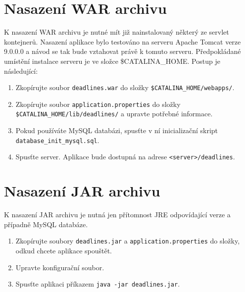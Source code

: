 \documentclass[thesis=B,czech]{FITthesis}[2012/06/26]
\begin{document}
	\section{Nasazení WAR archivu}
		K nasazení WAR archivu je nutné mít již nainstalovaný některý ze servlet kontejnerů. Nasazení aplikace bylo testováno na serveru Apache Tomcat verze 9.0.0.0 a návod se tak bude vztahovat právě k tomuto serveru. Předpokládané umístění instalace serveru je ve složce \$CATALINA\_HOME. Postup je následující:
		\begin{enumerate}
			\item Zkopírujte soubor \texttt{deadlines.war} do složky \texttt{\$CATALINA\_HOME/\allowbreak webapps/}.
			\item Zkopírujte soubor \texttt{application.properties} do složky \texttt{\$CATALINA\_HOME/\allowbreak lib/\allowbreak deadlines/} a upravte potřebné informace.
			\item Pokud používáte MySQL databázi, spusťte v ní inicializační skript \texttt{database\_init\_mysql.sql}.
			\item Spusťte server. Aplikace bude dostupná na adrese \texttt{<server>/deadlines}.
		\end{enumerate}
	
	\section{Nasazení JAR archivu}
		K nasazení JAR archivu je nutná jen přítomnost JRE odpovídající verze a případně MySQL databáze.
		\begin{enumerate}
			\item Zkopírujte soubory \texttt{deadlines.jar} a \texttt{application.properties} do složky, odkud chcete aplikace spouštět.
			\item Upravte konfigurační soubor.
			\item Spusťte aplikaci příkazem \texttt{java -jar deadlines.jar}.
		\end{enumerate}
		
	

\end{document}
